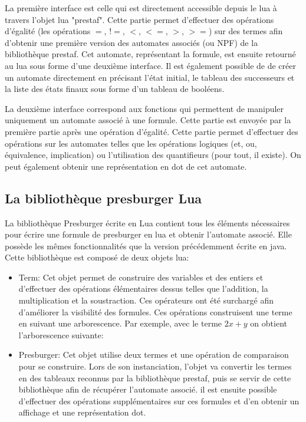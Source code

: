 La première interface est celle qui est directement accessible depuis le lua à travers l’objet lua "prestaf". Cette partie permet d’effectuer des opérations d’égalité (les opérations $=$, $!=$, $<$, $<=$, $>$, $>=$) sur des termes afin d’obtenir une première version des automates associés (ou NPF) de la bibliothèque prestaf. Cet automate, représentant la formule, est ensuite retourné au lua sous forme d’une deuxième interface. Il est également possible de de créer un automate directement en précisant l’état initial, le tableau des successeurs et la liste des états finaux sous forme d’un tableau de booléens.\\\par

La deuxième interface correspond aux fonctions qui permettent de manipuler uniquement un automate associé à une formule. Cette partie est envoyée par la première partie après une opération d’égalité. Cette partie permet d’effectuer des opérations sur les automates telles que les opérations logiques (et, ou, équivalence, implication) ou l’utilisation des quantifieurs (pour tout, il existe). On peut également obtenir une représentation en dot de cet automate.

\subsection{La bibliothèque presburger Lua}

La bibliothèque Presburger écrite en Lua contient tous les éléments nécessaires pour écrire une formule de presburger en lua et obtenir l’automate associé. Elle possède les mêmes fonctionnalités que la version précédemment écrite en java. Cette bibliothèque est composé de deux objets lua:
\begin{itemize}
\item Term: Cet objet permet de construire des variables et des entiers et d’effectuer des opérations élémentaires dessus telles que l’addition, la multiplication et la soustraction. Ces opérateurs ont été surchargé afin d’améliorer la visibilité des formules. Ces opérations construisent une terme en suivant une arborescence. Par exemple, avec le terme $2x + y$ on obtient l’arborescence suivante:
\begin{figure}[h]
\centering
{}
\end{figure}

\item Presburger: Cet objet utilise deux termes et une opération de comparaison pour se construire.
Lors de son instanciation, l’objet va convertir les termes en des tableaux reconnus par la bibliothèque prestaf, puis se servir de cette bibliothèque afin de récupérer l’automate associé. il est ensuite possible d’effectuer des opérations supplémentaires sur ces formules et d’en obtenir un affichage et une représentation dot.
\end{itemize}

